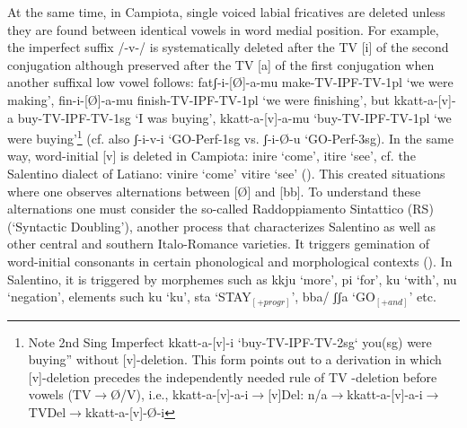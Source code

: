 \documentclass[output=paper]{langscibook}
\begin{document}
At the same time, in Campiota, single voiced labial fricatives are deleted unless they are found between identical vowels in word medial position.  For example, the imperfect suffix /-v-/ is systematically deleted after the TV [i] of the second conjugation although preserved after the TV [a] of the first conjugation when  another suffixal low vowel follows: fatʃ-i-[Ø]-a-mu make-TV-IPF-TV-1pl ‘we were making’, fin-i-[Ø]-a-mu finish-TV-IPF-TV-1pl ‘we were finishing’, but kkatt-a-[v]-a  buy-TV-IPF-TV-1sg ‘I was buying’, kkatt-a-[v]-a-mu ‘buy-TV-IPF-TV-1pl ‘we were buying’\footnote{Note 2nd Sing Imperfect kkatt-a-[v]-i ‘buy-TV-IPF-TV-2sg‘ you(sg) were buying” without [v]-deletion.  This form points out to a derivation in which [v]-deletion precedes the independently needed rule of TV -deletion before vowels (TV$\rightarrow$Ø/V), i.e., kkatt-a-[v]-a-i$\rightarrow$[v]Del: n/a$\rightarrow$kkatt-a-[v]-a-i$\rightarrow$TVDel$\rightarrow$kkatt-a-[v]-Ø-i}  (cf. also ʃ-i-v-i ‘GO-Perf-1sg vs. ʃ-i-Ø-u ‘GO-Perf-3sg).  In the same way, word-initial [v] is deleted in Campiota: inire  ‘come’, itire ‘see’, cf. the Salentino dialect of Latiano: vinire ‘come’ vitire ‘see’ (\cite{urgese2003a}).   This created situations where one observes alternations between [Ø] and [bb]. To understand these alternations one must consider the so-called Raddoppiamento Sintattico (RS) (‘Syntactic Doubling’), another process that characterizes Salentino as well as other central and southern Italo-Romance varieties.  It triggers gemination of word-initial consonants in certain phonological and morphological contexts (\cite{chierchia1986a, loporcaro1997}).  In Salentino, it is triggered by morphemes such as kkju ‘more’, pi ‘for’, ku ‘with’, nu ‘negation’, elements such ku ‘ku’, sta ‘STAY$_{[+progr]}$’, bba/ ʃʃa ‘GO$_{[+and]}$’ etc.
\end{document}

